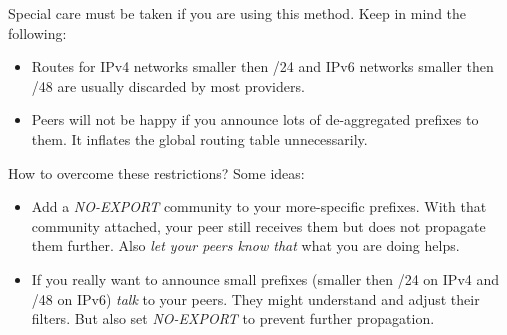 Special care must be taken if you are using this method. Keep in mind the following:
\begin{itemize}
  \item Routes for IPv4 networks smaller then /24 and IPv6 networks smaller then /48 are usually discarded by most providers.
  \item Peers will not be happy if you announce lots of de-aggregated prefixes to them. It inflates the global routing table unnecessarily.
\end{itemize}
How to overcome these restrictions? Some ideas:
\begin{itemize}
  \item Add a \emph{NO-EXPORT} community to your more-specific prefixes. With that community attached, your peer still receives them but does not propagate them further. Also \emph{let your peers know that} what you are doing helps.
  \item If you really want to announce small prefixes (smaller then /24 on IPv4 and /48 on IPv6) \emph{talk} to your peers. They might understand and adjust their filters. But also set \emph{NO-EXPORT} to prevent further propagation.
\end{itemize}
